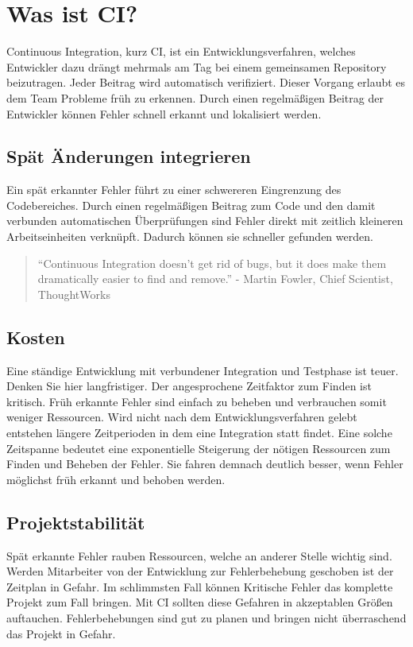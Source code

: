 \chapter{Was ist CI?}
Continuous Integration, kurz CI, ist ein Entwicklungsverfahren, welches Entwickler dazu drängt mehrmals am Tag bei einem gemeinsamen Repository beizutragen. Jeder Beitrag wird automatisch verifiziert. Dieser Vorgang erlaubt es dem Team Probleme früh zu erkennen.
Durch einen regelmäßigen Beitrag der Entwickler können Fehler schnell erkannt und lokalisiert werden.

\section{Spät Änderungen integrieren}
Ein spät erkannter Fehler führt zu einer schwereren Eingrenzung des Codebereiches. Durch einen regelmäßigen Beitrag zum Code und den damit verbunden automatischen Überprüfungen sind Fehler direkt mit zeitlich kleineren Arbeitseinheiten verknüpft. Dadurch können sie schneller gefunden werden.

\begin{quote}
“Continuous Integration doesn’t get rid of bugs, but it does make them dramatically easier to find and remove.” - Martin Fowler, Chief Scientist, ThoughtWorks
\end{quote}

\section{Kosten}
Eine ständige Entwicklung mit verbundener Integration und Testphase ist teuer. Denken Sie hier langfristiger. Der angesprochene Zeitfaktor zum Finden ist kritisch. Früh erkannte Fehler sind einfach zu beheben und verbrauchen somit weniger Ressourcen. Wird nicht nach dem Entwicklungsverfahren gelebt entstehen längere Zeitperioden in dem eine Integration statt findet. Eine solche Zeitspanne bedeutet eine exponentielle Steigerung der nötigen Ressourcen zum Finden und Beheben der Fehler. Sie fahren demnach deutlich besser, wenn Fehler möglichst früh erkannt und behoben werden.

\section{Projektstabilität}
Spät erkannte Fehler rauben Ressourcen, welche an anderer Stelle wichtig sind. Werden Mitarbeiter von der Entwicklung zur Fehlerbehebung geschoben ist der Zeitplan in Gefahr. Im schlimmsten Fall können Kritische Fehler das komplette Projekt zum Fall bringen. Mit CI sollten diese Gefahren in akzeptablen Größen auftauchen. Fehlerbehebungen sind gut zu planen und bringen nicht überraschend das Projekt in Gefahr. 

